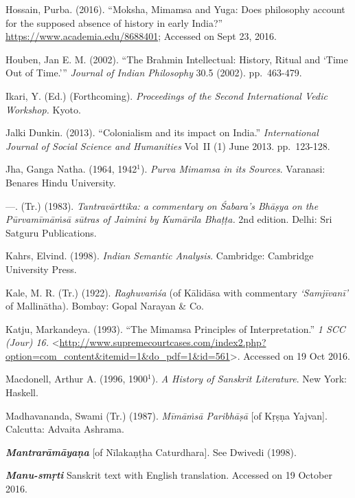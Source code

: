 \begin{thebibliography}{99}
  Hossain, Purba. (2016). “Moksha, Mimamsa and Yuga: Does philosophy account for the supposed absence of history in early India?” \url{https://www.academia.edu/8688401}; Accessed on Sept 23, 2016.

  Houben, Jan E. M. (2002). “The Brahmin Intellectual: History, Ritual and ‘Time Out of Time.’” \textit{Journal of Indian Philosophy} 30.5 (2002). pp.~463-479.

  Ikari, Y. (Ed.) (Forthcoming). \textit{Proceedings of the Second International Vedic Workshop.} Kyoto.

  Jalki Dunkin. (2013). “Colonialism and its impact on India.” \textit{International Journal of Social Science and Humanities} Vol~II (1) June 2013. pp.~123-128.

  Jha, Ganga Natha. (1964, 1942$^{1}$). \textit{Purva Mimamsa in its Sources}. Varanasi: Benares Hindu University.

  —. (Tr.) (1983). \textit{Tantravārttika: a commentary on Śabara's Bhāṣya on the Pūrvamīmāṁsā sūtras of Jaimini by Kumārila Bhaṭṭa.} 2nd edition. Delhi: Sri Satguru Publications.

  Kahrs, Elvind. (1998). \textit{Indian Semantic Analysis}. Cambridge: Cambridge University Press.

  Kale, M. R. (Tr.) (1922). \textit{Raghuvaṁśa} (of Kālidāsa with commentary \textit{‘Samjīvanī’} of Mallinātha). Bombay: Gopal Narayan \& Co.

  Katju, Markandeya. (1993). “The Mimamsa Principles of Interpretation.” \textit{1 SCC (Jour) 16.} \textless  \url{http://www.supremecourtcases.com/index2.php?option=com_content&itemid=1&do_pdf=1&id=561}\textgreater . Accessed on 19 Oct 2016.

  Macdonell, Arthur A. (1996, 1900$^{1}$). \textit{A History of Sanskrit Literature}. New York: Haskell.  

  Madhavananda, Swami (Tr.) (1987). \textit{Mīmāṁsā Paribhāṣā} [of Kṛṣṇa Yajvan]. Calcutta: Advaita Ashrama.

  \textbf{\textit{Mantrarāmāyaṇa}} [of Nīlakaṇṭha Caturdhara]. See Dwivedi (1998).

  \textbf{\textit{Manu-smṛti}} Sanskrit text with English translation. Accessed on 19 October 2016.


\end{thebibliography}
